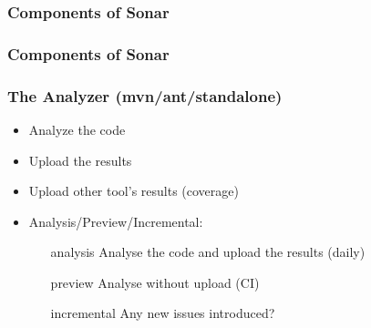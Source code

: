\documentclass{beamer}
\begin{document}
\begin{frame}
    \frametitle{Components of Sonar}
\end{frame}

\begin{frame}
    \frametitle{Components of Sonar}
\end{frame}

\begin{frame}
    \frametitle{The Analyzer (mvn/ant/standalone)}
    \begin{itemize}
        \item Analyze the code
        \pause
        \item Upload the results
        \pause
        \item Upload other tool's results (coverage)
        \pause
        \item Analysis/Preview/Incremental:
        \begin{itemize}
            \item[analysis] Analyse the code and upload the results (daily)
            \item[preview] Analyse without upload (CI)
            \item[incremental] Any new issues introduced?
        \end{itemize}
    \end{itemize}
\end{frame}
\end{document}
